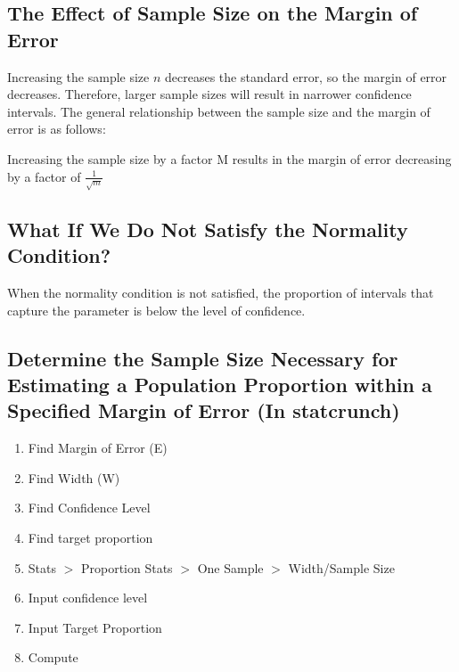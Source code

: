 \documentclass{report}
\begin{document}
    \subsection*{The Effect of Sample Size on the Margin of Error}
    \bigbreak \noindent 
    Increasing the sample size $n $ decreases the standard error, so the margin of error decreases. Therefore, larger sample sizes will result in narrower confidence intervals.
    \bigbreak \noindent 
    The general relationship between the sample size and the margin of error is as follows:
    \begin{center}
      Increasing the sample size by a factor M results in the margin of error decreasing by a factor of $\frac{1}{\sqrt{m}} $
    \end{center}

   \pagebreak 
   \subsection*{What If We Do Not Satisfy the Normality Condition?}
   \bigbreak \noindent 
   When the normality condition is not satisfied, the proportion of intervals that capture the parameter is below the level of confidence.

   \bigbreak \noindent \bigbreak \noindent 
   \subsection*{Determine the Sample Size Necessary for Estimating a Population Proportion within a Specified Margin of Error (In statcrunch)}
   \bigbreak \noindent 
   \begin{enumerate}
     \item Find Margin of Error (E)
     \item Find Width (W)
      \item Find Confidence Level
      \item Find target proportion
       \item Stats $>$ Proportion Stats $>$ One Sample $> $ Width/Sample Size
      \item Input confidence level
      \item Input Target Proportion
      \item Compute
   \end{enumerate}
\end{document}

